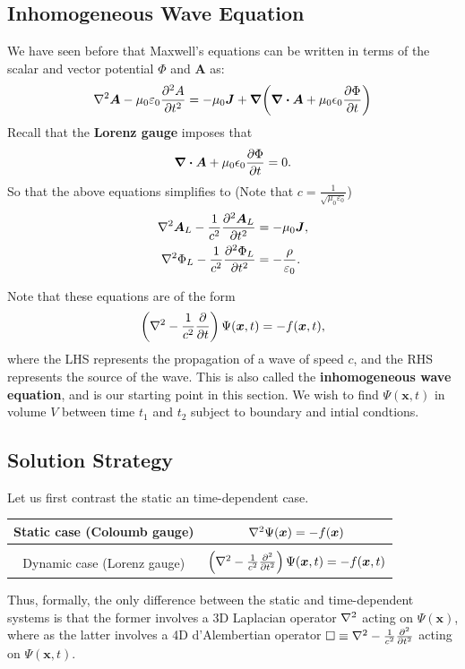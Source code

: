 \documentclass[12pt,english]{article}
\renewcommand{\vec}[1]{\boldsymbol{#1}}
\begin{document}
\subsection{Inhomogeneous Wave Equation}
We have seen before that Maxwell's equations can be written in terms of the scalar and vector potential $\Phi$ and $\vec{A}$ as:
\begin{equation*}
    \laplacian \vec{A} - \mu_0\varepsilon_0 \pdv[2]{A}{t} = -\mu_0 \vec{J} + \grad(\div \vec{A} + \mu_0\epsilon_0 \pdv{\Phi}{t})
\end{equation*}
Recall that the \textbf{Lorenz gauge} imposes that
\begin{equation*}
    \div \vec{A} + \mu_0\epsilon_0 \pdv{\Phi}{t} = 0.
\end{equation*}
So that the above equations simplifies to (Note that $c = \frac{1}{\sqrt{\mu_0\varepsilon_0}}$)
\begin{subequations}
    \begin{align}
        \laplacian \vec{A}_L - \frac{1}{c^2}\pdv[2]{\vec{A}_L}{t} & = -\mu_0\vec{J}               ,\\
        \laplacian \Phi_L -\frac{1}{c^2}\pdv[2]{\Phi_L}{t}        & = -\frac{\rho}{\varepsilon_0}.
    \end{align}
\end{subequations}

Note that these equations are of the form
\begin{equation}
    \left(\laplacian - \frac{1}{c^2} \pdv{t}\right)\Psi(\vec{x},t) = -f(\vec{x},t), \label{eqn:inhoWaveEqn}
\end{equation}
where the LHS represents the propagation of a wave of speed $c$, and the RHS represents the source of the wave. This is also called the \textbf{inhomogeneous wave equation}, and is our starting point in this section. We wish to find $\Psi(\vec{x},t)$ in volume $V$ between time $t_1$ and $t_2$ subject to boundary and intial condtions.


\subsection{Solution Strategy}
Let us first contrast the static an time-dependent case.

\begin{center}
    \begin{tabular}{c | c}
        Static case (Coloumb gauge) & $\laplacian \Psi(\vec{x}) = -f(\vec{x})$\\[2ex]
        \hline\\
        Dynamic case (Lorenz gauge) & $\left(\laplacian - \frac{1}{c^2}\pdv[2]{t} \right)\Psi(\vec{x},t) = -f(\vec{x},t)$
    \end{tabular}
\end{center}
Thus, formally, the only difference between the static and time-dependent systems is that the former involves a 3D Laplacian operator $\laplacian$ acting on $\Psi(\vec{x})$, where as the latter involves a 4D d'Alembertian operator $\square \equiv \laplacian - \frac{1}{c^2}\pdv[2]{t}$ acting on $\Psi(\vec{x}, t)$.
\end{document}
